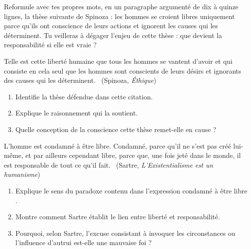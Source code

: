 \documentclass[11pt]{article}
\newcounter{popsec}
\newcounter{popsub}
\newcommand{\courssub}[1]{%
  \stepcounter{popsub}%
  \par\vspace{9pt}\noindent{\popxbold\fontsize{11.5}{13}\selectfont\color{popink}{\color{poporange}\thepopsec.\thepopsub}\hspace{6pt}#1}\par\nopagebreak\vspace{4pt}
}
\begin{document}
\courssub{Je m'entraîne}

\begin{exercice}
Reformule avec tes propres mots, en un paragraphe argumenté de dix à quinze lignes, la thèse suivante de Spinoza : les hommes se croient libres uniquement parce qu'ils ont conscience de leurs actions et ignorent les causes qui les déterminent. Tu veilleras à dégager l'enjeu de cette thèse : que devient la responsabilité si elle est vraie ?
\end{exercice}

\begin{exercice}
\guillemotleft Telle est cette liberté humaine que tous les hommes se vantent d'avoir et qui consiste en cela seul que les hommes sont conscients de leurs désirs et ignorants des causes qui les déterminent. \guillemotright\ (Spinoza, \emph{Éthique})
\begin{enumerate}
\item Identifie la thèse défendue dans cette citation.
\item Explique le raisonnement qui la soutient.
\item Quelle conception de la conscience cette thèse remet-elle en cause ?
\end{enumerate}
\end{exercice}

\begin{exercice}
\guillemotleft L'homme est condamné à être libre. Condamné, parce qu'il ne s'est pas créé lui-même, et par ailleurs cependant libre, parce que, une fois jeté dans le monde, il est responsable de tout ce qu'il fait. \guillemotright\ (Sartre, \emph{L'Existentialisme est un humanisme})
\begin{enumerate}
\item Explique le sens du paradoxe contenu dans l'expression \guillemotleft condamné à être libre \guillemotright.
\item Montre comment Sartre établit le lien entre liberté et responsabilité.
\item Pourquoi, selon Sartre, l'excuse consistant à invoquer les circonstances ou l'influence d'autrui est-elle une \guillemotleft mauvaise foi \guillemotright ?
\end{enumerate}
\end{exercice}
\end{document}
